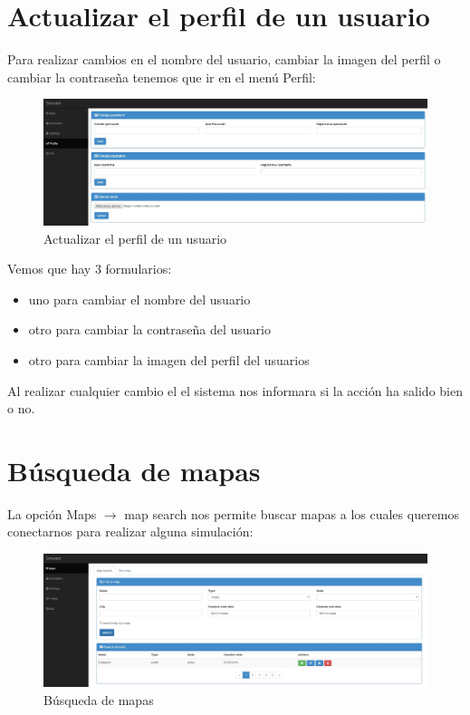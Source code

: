 \section{Actualizar el perfil de un usuario}

Para realizar cambios en el nombre del usuario, cambiar la imagen del perfil o cambiar la contraseña tenemos que ir en el menú Perfil:

\begin{figure}[H]
	\centering\includegraphics[scale=0.3]{imagenes/capitulo6/perfil-del-usuario.jpg}
	\caption{Actualizar el perfil de un usuario}
	\label{img:UpdateUser}
\end{figure}

Vemos que hay 3 formularios:

\begin{itemize}
	\item uno para cambiar el nombre del usuario
	\item otro para cambiar la contraseña del usuario
	\item otro para cambiar la imagen del perfil del usuarios
\end{itemize}

Al realizar cualquier cambio el el sistema nos informara si la acción ha salido bien o no.

\section{Búsqueda de mapas}\label{sec:BuscarMapas}

La opción Maps $\rightarrow$ map search nos permite buscar mapas a los cuales queremos conectarnos para realizar alguna simulación:

\begin{figure}[H]
	\centering\includegraphics[scale=0.3]{imagenes/capitulo7/busqueda-de-mapas.jpg}
	\caption{Búsqueda de mapas}
	\label{img:BuscarMapas}
\end{figure}

